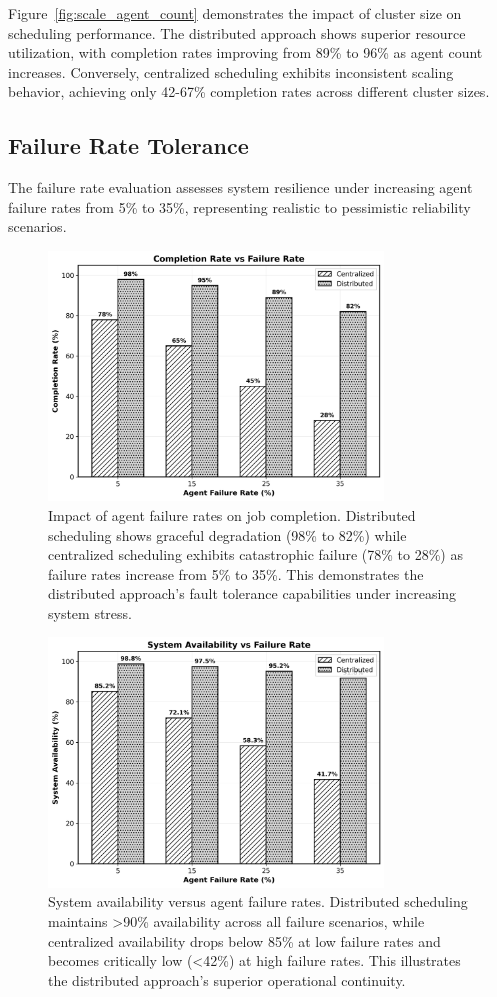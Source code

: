 \documentclass[conference]{IEEEtran}
\begin{document}
Figure~\ref{fig:scale_agent_count} demonstrates the impact of cluster size on scheduling performance. The distributed approach shows superior resource utilization, with completion rates improving from 89\% to 96\% as agent count increases. Conversely, centralized scheduling exhibits inconsistent scaling behavior, achieving only 42-67\% completion rates across different cluster sizes.

\subsection{Failure Rate Tolerance}

The failure rate evaluation assesses system resilience under increasing agent failure rates from 5\% to 35\%, representing realistic to pessimistic reliability scenarios.

\begin{figure}[!t]
\centering
\includegraphics[width=3.5in]{figure3_failure_rate_completion.png}
\caption{Impact of agent failure rates on job completion. Distributed scheduling shows graceful degradation (98\% to 82\%) while centralized scheduling exhibits catastrophic failure (78\% to 28\%) as failure rates increase from 5\% to 35\%. This demonstrates the distributed approach's fault tolerance capabilities under increasing system stress.}
\label{fig:failure_rate_completion}
\end{figure}

\begin{figure}[!t]
\centering
\includegraphics[width=3.5in]{figure4_failure_rate_availability.png}
\caption{System availability versus agent failure rates. Distributed scheduling maintains >90\% availability across all failure scenarios, while centralized availability drops below 85\% at low failure rates and becomes critically low (<42\%) at high failure rates. This illustrates the distributed approach's superior operational continuity.}
\label{fig:failure_rate_availability}
\end{figure}
\end{document}
